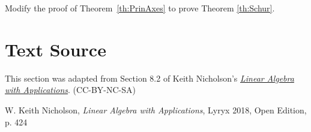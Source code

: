 \documentclass{ximera}
\begin{document}
\begin{problem}
Modify the proof of Theorem~\ref{th:PrinAxes} to prove Theorem \ref{th:Schur}.
\end{problem}

\section*{Text Source} This section was adapted from Section 8.2 of Keith Nicholson's \href{https://open.umn.edu/opentextbooks/textbooks/linear-algebra-with-applications}{\it Linear Algebra with Applications}. (CC-BY-NC-SA)

W. Keith Nicholson, {\it Linear Algebra with Applications}, Lyryx 2018, Open Edition, p. 424
\end{document}
